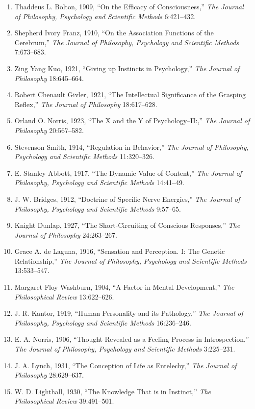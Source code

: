 \documentclass[
]{article}
\begin{document}
\begin{enumerate}
\def\labelenumi{\arabic{enumi}.}
\item
  Thaddeus L. Bolton, 1909, ``On the Efficacy of Consciousness,''
  \emph{The Journal of Philosophy, Psychology and Scientific Methods}
  6:421--432.
\item
  Shepherd Ivory Franz, 1910, ``On the Association Functions of the
  Cerebrum,'' \emph{The Journal of Philosophy, Psychology and Scientific
  Methods} 7:673--683.
\item
  Zing Yang Kuo, 1921, ``Giving up Instincts in Psychology,'' \emph{The
  Journal of Philosophy} 18:645--664.
\item
  Robert Chenault Givler, 1921, ``The Intellectual Significance of the
  Grasping Reflex,'' \emph{The Journal of Philosophy} 18:617--628.
\item
  Orland O. Norris, 1923, ``The X and the Y of Psychology--II:,''
  \emph{The Journal of Philosophy} 20:567--582.
\item
  Stevenson Smith, 1914, ``Regulation in Behavior,'' \emph{The Journal
  of Philosophy, Psychology and Scientific Methods} 11:320--326.
\item
  E. Stanley Abbott, 1917, ``The Dynamic Value of Content,'' \emph{The
  Journal of Philosophy, Psychology and Scientific Methods} 14:41--49.
\item
  J. W. Bridges, 1912, ``Doctrine of Specific Nerve Energies,''
  \emph{The Journal of Philosophy, Psychology and Scientific Methods}
  9:57--65.
\item
  Knight Dunlap, 1927, ``The Short-Circuiting of Conscious Responses,''
  \emph{The Journal of Philosophy} 24:263--267.
\item
  Grace A. de Laguna, 1916, ``Sensation and Perception. I: The Genetic
  Relationship,'' \emph{The Journal of Philosophy, Psychology and
  Scientific Methods} 13:533--547.
\item
  Margaret Floy Washburn, 1904, ``A Factor in Mental Development,''
  \emph{The Philosophical Review} 13:622--626.
\item
  J. R. Kantor, 1919, ``Human Personality and its Pathology,'' \emph{The
  Journal of Philosophy, Psychology and Scientific Methods} 16:236--246.
\item
  E. A. Norris, 1906, ``Thought Revealed as a Feeling Process in
  Introspection,'' \emph{The Journal of Philosophy, Psychology and
  Scientific Methods} 3:225--231.
\item
  J. A. Lynch, 1931, ``The Conception of Life as Entelechy,'' \emph{The
  Journal of Philosophy} 28:629--637.
\item
  W. D. Lighthall, 1930, ``The Knowledge That is in Instinct,''
  \emph{The Philosophical Review} 39:491--501.
\end{enumerate}
\end{document}
